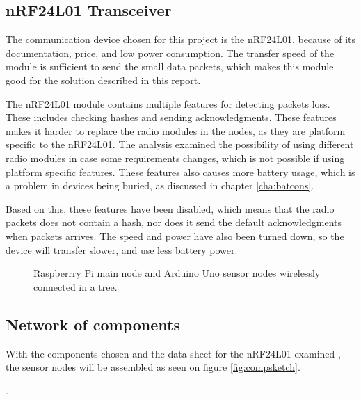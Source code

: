 \subsection{nRF24L01 Transceiver}
The communication device chosen for this project is the nRF24L01, because of its documentation, price, and low power consumption. The transfer speed of the module is sufficient to send the small data packets, which makes this module good for the solution described in this report.

The nRF24L01 module contains multiple features for detecting packets loss. These includes checking hashes and sending acknowledgments\cite{nf24datasheet}. These features makes it harder to replace the radio modules in the nodes, as they are platform specific to the nRF24L01. The analysis examined the possibility of using different radio modules in case some requirements changes, which is not possible if using platform specific features. These features also causes more battery usage, which is a problem in devices being buried, as discussed in chapter \ref{cha:batcons}.

Based on this, these features have been disabled, which means that the radio packets does not contain a hash, nor does it send the default acknowledgments when packets arrives. The speed and power have also been turned down, so the device will transfer slower, and use less battery power.

\begin{figure}[!h]
	\centering
	\caption{Raspberrry Pi main node and Arduino Uno sensor nodes wirelessly connected in a tree.}
	\label{fig:raspbuinoTree}
\end{figure}

\subsection*{Network of components}

With the components chosen and the data sheet for the nRF24L01 examined \cite{nf24datasheet}, the sensor nodes will be assembled as seen on figure \ref{fig:compsketch}.

.



